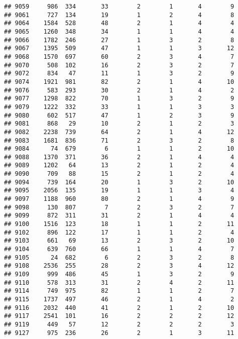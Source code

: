 \documentclass[]{article}
\begin{document}
\begin{verbatim}
## 9059     986  334       33        2        1       4        9
## 9061     727  134       19        1        2       4        8
## 9064    1584  528       48        2        1       4        4
## 9065    1260  348       34        1        1       4        4
## 9066    1782  246       27        1        3       2        8
## 9067    1395  509       47        1        1       3       12
## 9068    1570  697       60        2        3       4        7
## 9070     508  102       16        2        3       2        7
## 9072     834   47       11        1        3       2        9
## 9074    1921  981       82        2        1       4       10
## 9076     583  293       30        2        1       4        2
## 9077    1298  822       70        1        3       2        9
## 9079    1222  332       33        1        1       3        3
## 9080     602  517       47        1        2       3        9
## 9081     868   29       10        2        1       2        3
## 9082    2238  739       64        2        1       4       12
## 9083    1681  836       71        2        3       2        8
## 9084      74  679        6        1        1       2       10
## 9088    1370  371       36        2        1       4        4
## 9089    1202   64       13        2        1       2        4
## 9090     709   88       15        2        1       2        4
## 9094     739  164       20        1        3       2       10
## 9095    2056  135       19        1        1       3        4
## 9097    1188  960       80        2        1       4        9
## 9098     130  807        7        2        3       2        7
## 9099     872  311       31        2        1       4        4
## 9100    1516  123       18        1        1       2       11
## 9102     896  122       17        1        1       2        4
## 9103     661   69       13        2        3       2       10
## 9104     639  760       66        1        1       4        7
## 9105      24  682        6        2        3       2        8
## 9108    2536  255       28        2        3       4       12
## 9109     999  486       45        1        3       2        9
## 9110     578  313       31        2        4       2       11
## 9114     749  975       82        1        1       2        7
## 9115    1737  497       46        2        1       4        2
## 9116    2032  440       41        2        1       2       10
## 9117    2541  101       16        2        2       2       12
## 9119     449   57       12        2        2       2        3
## 9127     975  236       26        2        1       3       11

\end{verbatim}
\end{document}

